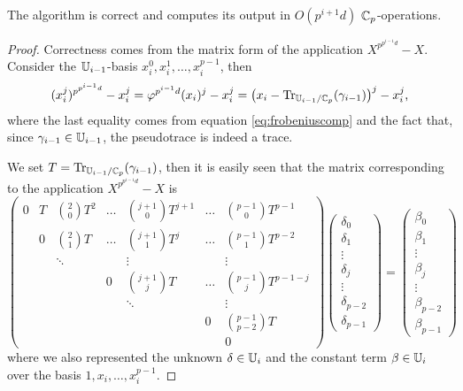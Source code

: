 \begin{theorem}
  \label{th:approximateAS}
  The algorithm  is correct and computes its output
  in $O(p^{i+1}d)$ $\mathbb{C}_p$-operations.
\end{theorem}
\begin{proof}
  Correctness comes from the matrix form of the application
  $X^{p^{p^{i-1}d}}-X$. Consider the $\mathbb{U}_{i-1}$-basis
  $x_i^0,x_i^1,\ldots,x_i^{p-1}$, then 
  \begin{equation*}
    (x_i^j)^{p^{p^{i-1}d}} - x_i^j = \varphi^{p^{i-1}d}(x_i)^j - x_i^j =
    \left(x_i - \operatorname{Tr}_{\mathbb{U}_{i-1}/\mathbb{C}_p}(\gamma_{i-1})\right)^j - x_i^j
    \text{,}
  \end{equation*}
  where the last equality comes from equation \eqref{eq:frobeniuscomp}
  and the fact that, since $\gamma_{i-1}\in\mathbb{U}_{i-1}$, the pseudotrace
  is indeed a trace.

  We set $T = \operatorname{Tr}_{\mathbb{U}_{i-1}/\mathbb{C}_p}(\gamma_{i-1})$, then it is easily
  seen that the matrix corresponding to the application
  $X^{p^{p^{i-1}d}}-X$ is
  \begin{equation}
    \label{eq:approximate-matrix}
    \begin{pmatrix}
      0 & T & \binom{2}{0}T^2 & \hdots &\binom{j+1}{0}T^{j+1} & \hdots & \binom{p-1}{0}T^{p-1} \\
        & 0 & \binom{2}{1}T^{\phantom{2}}   & \hdots & \binom{j+1}{1}T^{j\phantom{+1}} & \hdots & \binom{p-1}{1}T^{p-2} \\
        &   & \ddots          &        &\vdots&&  \vdots               \\
        &   &                 &  0     & \binom{j+1}{j}T & \hdots & \binom{p-1}{j}T^{p-1-j}\\
        &   &                 &        &    \ddots       &        & \vdots\\
        &   &                 &        &                 &   0    &\binom{p-1}{p-2}T \\
        &   &                 &        &&& 0
    \end{pmatrix}
    \begin{pmatrix}
      \delta_0\\
      \delta_1\\
      \vdots\\
      \delta_j\\
      \vdots\\
      \delta_{p-2}\\
      \delta_{p-1}
    \end{pmatrix}
    =
    \begin{pmatrix}
      \beta_0\\
      \beta_1\\
      \vdots\\
      \beta_j\\
      \vdots\\
      \beta_{p-2}\\
      \beta_{p-1}
    \end{pmatrix}
  \end{equation}
  where we also represented the unknown $\delta\in\mathbb{U}_i$ and the
  constant term $\beta\in\mathbb{U}_i$ over the basis $1,x_i,\ldots,x_i^{p-1}$.


\end{proof}

